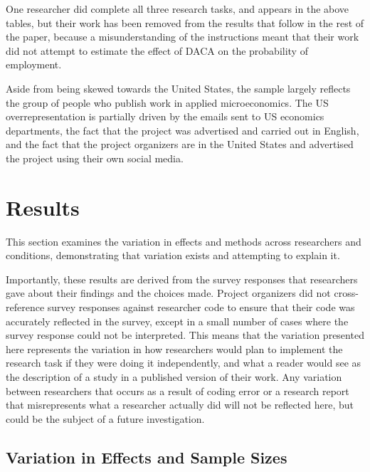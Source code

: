 \documentclass[
  letterpaper,
  DIV=11,
  numbers=noendperiod]{scrartcl}
\begin{document}
One researcher did complete all three research tasks, and appears in the
above tables, but their work has been removed from the results that
follow in the rest of the paper, because a misunderstanding of the
instructions meant that their work did not attempt to estimate the
effect of DACA on the probability of employment.

Aside from being skewed towards the United States, the sample largely
reflects the group of people who publish work in applied microeconomics.
The US overrepresentation is partially driven by the emails sent to US
economics departments, the fact that the project was advertised and
carried out in English, and the fact that the project organizers are in
the United States and advertised the project using their own social
media.

\hypertarget{results}{%
\section{Results}\label{results}}

This section examines the variation in effects and methods across
researchers and conditions, demonstrating that variation exists and
attempting to explain it.

Importantly, these results are derived from the survey responses that
researchers gave about their findings and the choices made. Project
organizers did not cross-reference survey responses against researcher
code to ensure that their code was accurately reflected in the survey,
except in a small number of cases where the survey response could not be
interpreted. This means that the variation presented here represents the
variation in how researchers would plan to implement the research task
if they were doing it independently, and what a reader would see as the
description of a study in a published version of their work. Any
variation between researchers that occurs as a result of coding error or
a research report that misrepresents what a researcher actually did will
not be reflected here, but could be the subject of a future
investigation.

\hypertarget{sec-variation}{%
\subsection{Variation in Effects and Sample Sizes}\label{sec-variation}}
\end{document}
